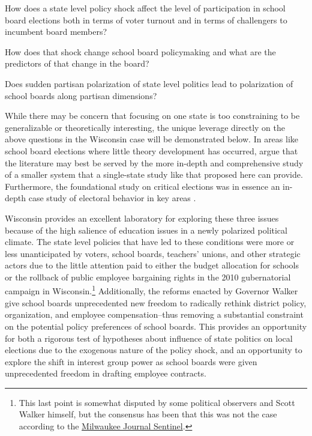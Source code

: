 \vspace{-6mm}
\begin{enumerate}
\begin{singlespace}
\setlength\itemsep{-6pt}
\item How does a state level policy shock affect the level of participation in school board elections both in terms of voter turnout and in terms of challengers to incumbent board members?
\item How does that shock change school board policymaking and what are the predictors of that change in the board?
\item Does sudden partisan polarization of state level politics lead to polarization of school boards along partisan dimensions?
\end{singlespace}
\end{enumerate}
\vspace{-3mm}

While there may be concern that focusing on one state is too constraining to be generalizable or theoretically interesting, the unique leverage directly on the above questions in the Wisconsin case will be demonstrated below. In areas like school board elections where little theory development has occurred, \citet{RefWorks:192} argue that the literature may best be served by the more in-depth and comprehensive study of a smaller system that a single-state study like that proposed here can provide. Furthermore, the foundational study on critical elections was in essence an in-depth case study of electoral behavior in key areas \citep{RefWorks:348}.

Wisconsin provides an excellent laboratory for exploring these three issues because of the high salience of education issues in a newly polarized political climate. The state level policies that have led to these conditions were more or less unanticipated by voters, school boards, teachers' unions, and other strategic actors due to the little attention paid to either the budget allocation for schools or the rollback of public employee bargaining rights in the 2010 gubernatorial campaign in Wisconsin.\footnote{This last point is somewhat disputed by some political observers and Scott Walker himself, but the consensus has been that this was not the case according to the \href{http://www.politifact.com/wisconsin/statements/2011/feb/22/scott-walker/wisconsin-gov-scott-walker-says-he-campaigned-his-/}{Milwaukee Journal Sentinel}.} Additionally, the reforms enacted by Governor Walker give school boards unprecedented new freedom to radically rethink district policy, organization, and employee compensation--thus removing a substantial constraint on the potential policy preferences of school boards. This provides an opportunity for both a rigorous test of hypotheses about influence of state politics on local elections due to the exogenous nature of the policy shock, and an opportunity to explore the shift in interest group power as school boards were given unprecedented freedom in drafting employee contracts. 

